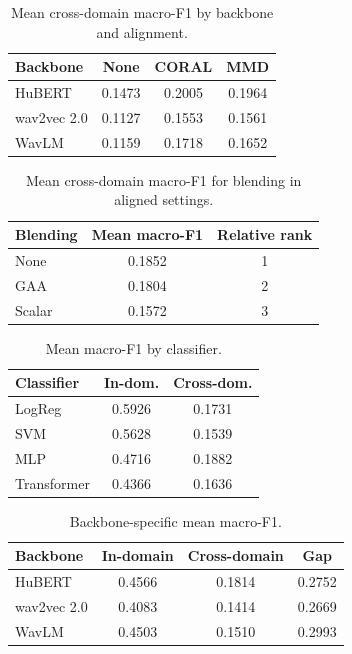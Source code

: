 \documentclass[9pt,twocolumn,letterpaper]{article}
\begin{document}
\begin{table}[t]
\centering
\caption{Mean cross-domain macro-F1 by backbone and alignment.}
\label{tab:backbone_alignment}
\scriptsize
\setlength{\tabcolsep}{2.5pt}
\begin{tabular}{lccc}
\toprule
Backbone & None & CORAL & MMD \\
\midrule
HuBERT & 0.1473 & 0.2005 & 0.1964 \\
wav2vec 2.0 & 0.1127 & 0.1553 & 0.1561 \\
WavLM & 0.1159 & 0.1718 & 0.1652 \\
\bottomrule
\end{tabular}
\end{table}

\begin{table}[t]
\centering
\caption{Mean cross-domain macro-F1 for blending in aligned settings.}
\label{tab:blending}
\scriptsize
\setlength{\tabcolsep}{2.5pt}
\begin{tabular}{lcc}
\toprule
Blending & Mean macro-F1 & Relative rank \\
\midrule
None & 0.1852 & 1 \\
GAA & 0.1804 & 2 \\
Scalar & 0.1572 & 3 \\
\bottomrule
\end{tabular}
\end{table}

\begin{table}[t]
\centering
\caption{Mean macro-F1 by classifier.}
\label{tab:classifier}
\scriptsize
\setlength{\tabcolsep}{2.5pt}
\begin{tabular}{lcc}
\toprule
Classifier & In-dom. & Cross-dom. \\
\midrule
LogReg & 0.5926 & 0.1731 \\
SVM & 0.5628 & 0.1539 \\
MLP & 0.4716 & 0.1882 \\
Transformer & 0.4366 & 0.1636 \\
\bottomrule
\end{tabular}
\end{table}

\begin{table}[t]
\centering
\caption{Backbone-specific mean macro-F1.}
\label{tab:domain_gap}
\scriptsize
\setlength{\tabcolsep}{2.5pt}
\begin{tabular}{lccc}
\toprule
Backbone & In-domain & Cross-domain & Gap \\
\midrule
HuBERT & 0.4566 & 0.1814 & 0.2752 \\
wav2vec 2.0 & 0.4083 & 0.1414 & 0.2669 \\
WavLM & 0.4503 & 0.1510 & 0.2993 \\
\bottomrule
\end{tabular}
\end{table}
\end{document}
